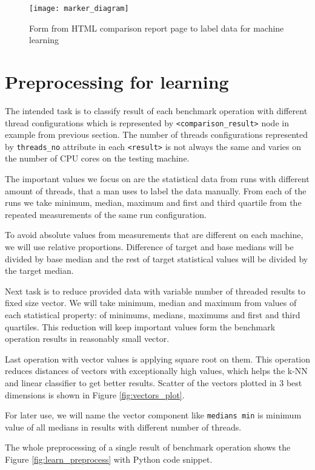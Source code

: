 \begin{figure}
  \centering
  \texttt{[image: marker\_diagram]}
  \caption{Form from HTML comparison report page to label data for machine learning}
  \label{fig:marker_diagram}
\end{figure}

\section{Preprocessing for learning} \label{sec:learn_preprocess}
The intended task is to classify result of each benchmark operation with
different thread configurations which is represented by
\texttt{<comparison\_result>} node in example from previous section. The number
of threads configurations represented by \texttt{threads\_no} attribute in each
\texttt{<result>} is not always the same and varies on the number of CPU cores
on the testing machine.

The important values we focus on are the statistical data from runs with
different amount of threads, that a man uses to label the data manually. From
each of the runs we take minimum, median, maximum and first and third quartile
from the repeated measurements of the same run configuration.

To avoid absolute values from measurements that are different on each machine,
we will use relative proportions. Difference of target and base medians will be
divided by base median and the rest of target statistical values will be divided
by the target median.

Next task is to reduce provided data with variable number of threaded results
to fixed size vector. We will take minimum, median and maximum from values of
each statistical property: of minimums, medians, maximums and first and third
quartiles. This reduction will keep important values form the benchmark
operation results in reasonably small vector.

Last operation with vector values is applying square root on them. This
operation reduces distances of vectors with exceptionally high values, which
helps the k-NN and linear classifier to get better results. Scatter of the
vectors plotted in 3 best dimensions is shown in Figure \ref{fig:vectors_plot}.

For later use, we will name the vector component like \texttt{medians min} is
minimum value of all medians in results with different number of threads.

The whole preprocessing of a single result of benchmark operation shows the
Figure \ref{fig:learn_preprocess} with Python code snippet.

